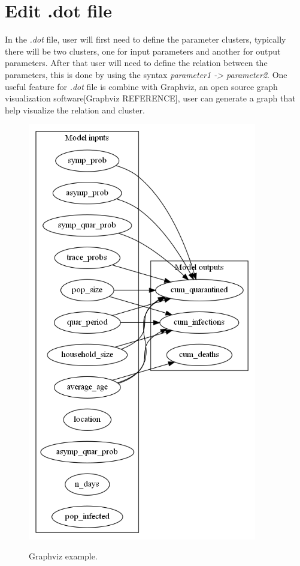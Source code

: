 \section{Edit .dot file}
In the \textsl{.dot} file, user will first need to define the parameter clusters, typically there will be two clusters, one for input parameters and another for output parameters. After that user will need to define the relation between the parameters, this is done by using the syntax \textsl{ parameter1 -> parameter2}. One useful feature for \textsl{.dot} file is combine with Graphviz, an open source graph visualization software[Graphviz REFERENCE], user can generate a graph that help visualize the relation and cluster. 
\begin{figure}[H]
	\centering
	\includegraphics[width=10cm]{figures/dotExample.png}\\
	\caption{Graphviz example.}
	\label{fig:figure13}
\end{figure}
